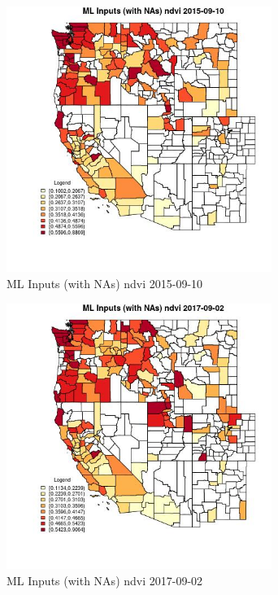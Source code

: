 \begin{figure} 
\centering  
\includegraphics[width=0.77\textwidth]{Code_Outputs/Report_ML_input_PM25_Step4_part_e_de_duplicated_aves_compiled_2019-05-20wNAs_CountyndviMean2015-09-10.jpg} 
\caption{\label{fig:Report_ML_input_PM25_Step4_part_e_de_duplicated_aves_compiled_2019-05-20wNAsCountyndviMean2015-09-10}ML Inputs (with NAs) ndvi 2015-09-10} 
\end{figure} 
 

\begin{figure} 
\centering  
\includegraphics[width=0.77\textwidth]{Code_Outputs/Report_ML_input_PM25_Step4_part_e_de_duplicated_aves_compiled_2019-05-20wNAs_CountyndviMean2017-09-02.jpg} 
\caption{\label{fig:Report_ML_input_PM25_Step4_part_e_de_duplicated_aves_compiled_2019-05-20wNAsCountyndviMean2017-09-02}ML Inputs (with NAs) ndvi 2017-09-02} 
\end{figure} 
 

